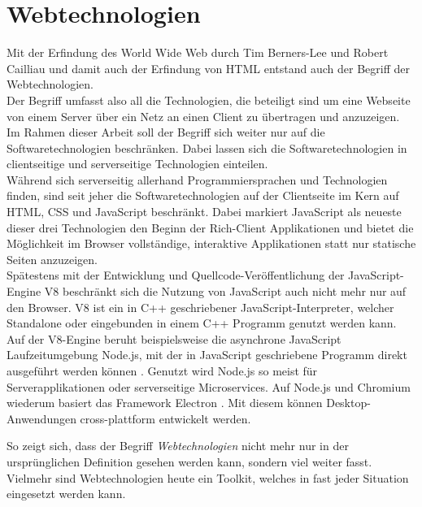 \section{Webtechnologien}
\label{sec:webtechnologien}

Mit der Erfindung des World Wide Web durch Tim Berners-Lee und Robert Cailliau und damit auch der Erfindung 
von HTML \cite{www} entstand auch der Begriff der Webtechnologien.\\
Der Begriff umfasst also all die Technologien, die beteiligt sind um eine Webseite von einem Server über ein 
Netz an einen Client zu übertragen und anzuzeigen.\\

Im Rahmen dieser Arbeit soll der Begriff sich weiter nur auf die Softwaretechnologien beschränken. Dabei lassen
sich die Softwaretechnologien in clientseitige und serverseitige Technologien einteilen.\\
Während sich serverseitig allerhand Programmiersprachen und Technologien finden, sind seit jeher die Softwaretechnologien
auf der Clientseite im Kern auf HTML, CSS und JavaScript beschränkt. Dabei markiert JavaScript als neueste dieser
drei Technologien \cite{jspress} den Beginn der Rich-Client Applikationen und bietet die Möglichkeit im Browser 
vollständige, interaktive Applikationen statt nur statische Seiten anzuzeigen.\\
Spätestens mit der Entwicklung und Quellcode-Veröffentlichung der JavaScript-Engine V8 \cite{v8} beschränkt sich die Nutzung
von JavaScript auch nicht mehr nur auf den Browser. V8 ist ein in C++ geschriebener JavaScript-Interpreter,
welcher Standalone oder eingebunden in einem C++ Programm genutzt werden kann.\\
Auf der V8-Engine beruht beispielsweise die asynchrone JavaScript Laufzeitumgebung Node.js, mit der in 
JavaScript geschriebene Programm direkt ausgeführt werden können \cite{node}. Genutzt wird Node.js so meist für Serverapplikationen
oder serverseitige Microservices.
Auf Node.js und Chromium wiederum basiert das Framework Electron \cite{electron}. Mit diesem können Desktop-Anwendungen
cross-plattform entwickelt werden.

So zeigt sich, dass der Begriff \emph{Webtechnologien} nicht mehr nur in der ursprünglichen Definition gesehen werden kann,
sondern viel weiter fasst. Vielmehr sind Webtechnologien heute ein Toolkit, welches in fast jeder Situation eingesetzt werden
kann. 


% 